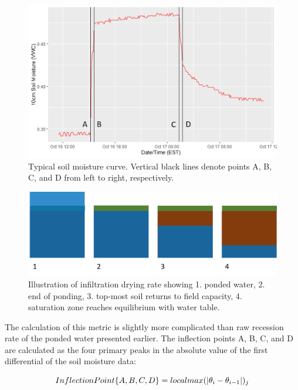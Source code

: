 \begin{figure}[ht]
	\centering
	\includegraphics[width=\textwidth]{gfx/chapter-data-analysis/typ_soil_moisture.png}
	\caption[Typical soil moisture curve.]{Typical soil moisture curve. Vertical black lines denote points A, B, C, and D from left to right, respectively.}
	\label{fig:typ-soil-moisture}
\end{figure}


\begin{figure}[ht]
	\centering
	\includegraphics[width=\textwidth]{gfx/chapter-data-analysis/drying_rate_sketch.png}
	\caption[Illustration of infiltration drying rate.]{Illustration of infiltration drying rate showing 1. ponded water, 2. end of ponding, 3. top-most soil returns to field capacity, 4. saturation zone reaches equilibrium with water table.}
	\label{fig:drying-rate-sketch}
\end{figure}

The calculation of this metric is slightly more complicated than raw recession rate of the ponded water presented earlier.
The inflection points A, B, C, and D are calculated as the four primary peaks in the absolute value of the first differential of the soil moisture data:

\begin{equation}
	\centering
	Inflection Point\{A,B,C,D\} = local max(|\theta_{i} - \theta_{i-1}|)_{j}
	\label{eq:soil-moisture-inflection}
\end{equation}


